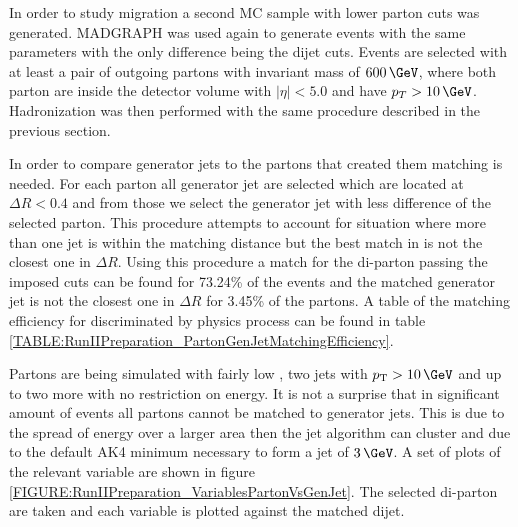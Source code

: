 In order to study migration a second \gls{MC} sample with lower parton cuts was generated. \textsc{MADGRAPH} was used again to generate events with the same parameters with the only difference being the dijet cuts. Events are selected with at least a pair of outgoing partons with invariant mass of $600\,\GeV$, where both parton are inside the detector volume with $|\eta|<5.0$ and have $p_{T}>10\,\GeV$. Hadronization was then performed with the same procedure described in the previous section.

In order to compare generator jets to the partons that created them matching is needed. For each parton all generator jet are selected which are located at $\Delta R < 0.4$ and from those we select the generator jet with less difference of \pt the selected parton. This procedure attempts to account for situation where more than one jet is within the matching distance but the best match in \pt is not the closest one in $\Delta R$. Using this procedure a match for the di-parton passing the imposed cuts can be found for 73.24\% of the events and the matched generator jet is not the closest one in $\Delta R$ for 3.45\% of the partons. A table of the matching efficiency for discriminated by physics process can be found in table \ref{TABLE:RunIIPreparation_PartonGenJetMatchingEfficiency}. 



Partons are being simulated with fairly low \pt, two jets with $\pt > 10\,\GeV$ and up to two more with no restriction on energy. It is not a surprise that in significant amount of events all partons cannot be matched to generator jets. This is due to the spread of energy over a larger area then the jet algorithm can cluster and due to the default AK4 minimum \pt necessary to form a jet of $3\,\GeV$. A set of plots of the relevant variable are shown in figure \ref{FIGURE:RunIIPreparation_VariablesPartonVsGenJet}. The selected di-parton are taken and each variable is plotted against the matched dijet.


